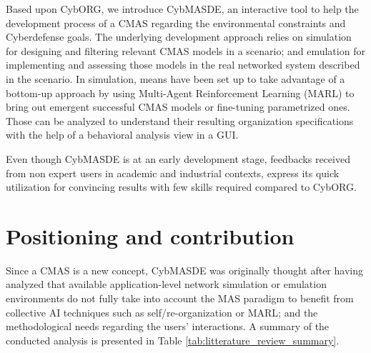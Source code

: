 \documentclass[sigconf]{aamas}
\begin{document}

Based upon CybORG, we introduce CybMASDE, an interactive tool to help the development process of a CMAS regarding the environmental constraints and Cyberdefense goals. The underlying development approach relies on simulation for designing and filtering relevant CMAS models in a scenario; and emulation for implementing and assessing those models in the real networked system described in the scenario.
In simulation, means have been set up to take advantage of a bottom-up approach by using Multi-Agent Reinforcement Learning (MARL) to bring out emergent successful CMAS models or fine-tuning parametrized ones. Those can be analyzed to understand their resulting organization specifications with the help of a behavioral analysis view in a GUI.


Even though CybMASDE is at an early development stage, feedbacks received from non expert users in academic and industrial contexts, express its quick utilization for convincing results with few skills required compared to CybORG.



\section{Positioning and contribution}

Since a CMAS is a new concept, CybMASDE was originally thought after having analyzed that available application-level network simulation or emulation environments do not fully take into account the MAS paradigm to benefit from collective AI techniques such as self/re-organization or MARL; and the methodological needs regarding the users' interactions. A summary of the conducted analysis is presented in Table \ref{tab:litterature_review_summary}.

\end{document}
